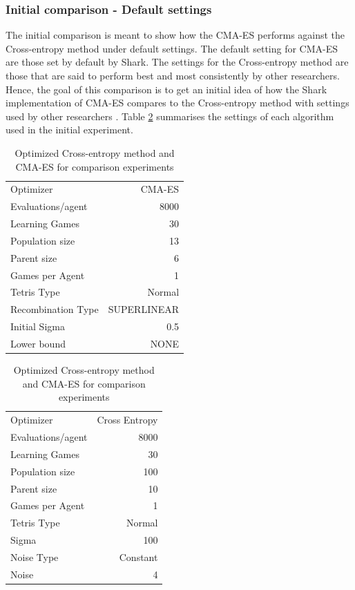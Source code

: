 \subsubsection{Initial comparison - Default settings \label{sec:initialCompare}}
The initial comparison is meant to show how the CMA-ES performs against the Cross-entropy method
under default settings. The default setting for CMA-ES are those set by default
by Shark. The settings for the Cross-entropy method are those that are said to perform best
and most
consistently by other researchers.
Hence, the goal of this comparison is to get an initial 
idea of how the Shark implementation of
CMA-ES compares to the Cross-entropy method with settings
used by other researchers \citep{scherrer2009}. Table \ref{tab:initialComparisonSettings}
summarises the settings of each algorithm used in the initial experiment.
\begin{table}[H]
\centering
\begin{tabular}{l r}
Optimizer & CMA-ES\\
Evaluations/agent & 8000\\
Learning Games & 30\\
Population size& 13\\
Parent size & 6\\
Games per Agent & 1\\
Tetris Type & Normal\\
\hline
Recombination Type & SUPERLINEAR\\
Initial Sigma & 0.5\\
Lower bound & NONE\\
\end{tabular}
\quad
\begin{tabular}{l r}
Optimizer & Cross Entropy\\
Evaluations/agent & 8000\\
Learning Games & 30\\
Population size & 100\\
Parent size & 10\\
Games per Agent & 1\\
Tetris Type & Normal\\
\hline
Sigma & 100\\
Noise Type & Constant\\
Noise & 4
\end{tabular}
\caption{Optimized Cross-entropy method and CMA-ES for comparison experiments \label{tab:initialComparisonSettings}}
\end{table}


